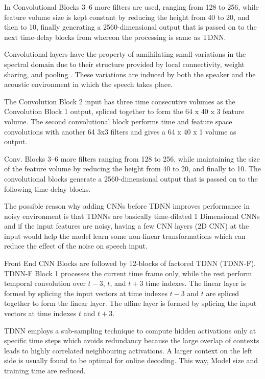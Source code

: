 In Convolutional Blocks 3–6 more filters are used, ranging from 128 to 256, while feature volume size is kept constant by reducing the height from 40 to 20, and then to 10, finally generating a 2560-dimensional output that is passed on to the next time-delay blocks from whereon the processing is same as TDNN.

Convolutional layers have the property of annihilating small variations in the spectral domain due to their structure provided by local connectivity, weight sharing, and pooling \cite{georgescu_performance_2021}. These variations are induced by both the speaker and the acoustic environment in which the speech takes place. 

The Convolution Block 2 input has three time consecutive volumes as the Convolution Block 1 output, spliced together to form the 64 x 40 x 3 feature volume. The second convolutional block performs time and feature space convolutions with another 64 3x3 filters and gives a 64 x 40 x 1 volume as output.

Conv. Blocks 3–6 more filters ranging from 128 to 256, while maintaining the size of the feature volume by reducing the height from 40 to 20, and finally to 10. The convolutional blocks generate a 2560-dimensional output that is passed on to the following time-delay blocks. %

The possible reason why adding CNNs before TDNN improves performance in noisy environment is that TDNNs are basically time-dilated 1 Dimensional CNNs and if the input features are noisy, having a few CNN layers (2D CNN) at the input would help the model learn some non-linear transformations which can reduce the effect of the noise on speech input. %

Front End CNN Blocks are followed by 12-blocks of factored TDNN (TDNN-F). TDNN-F Block 1 processes the current time frame only, while the rest perform temporal convolution over $t-3$, $t$, and $t+3$  time indexes. The linear layer is formed by splicing the input vectors at time indexes $t-3$ and $t$ are spliced together to form the linear layer. The affine layer is formed by splicing the input vectors at time indexes $t$ and $t+3$.  

TDNN employs a sub-sampling technique to compute hidden activations only at specific time steps which avoids redundancy because the large overlap of contexts leads to highly correlated neighbouring activations. A larger context on the left side is usually found to be optimal for online decoding. This way, Model size and training time are reduced. 

